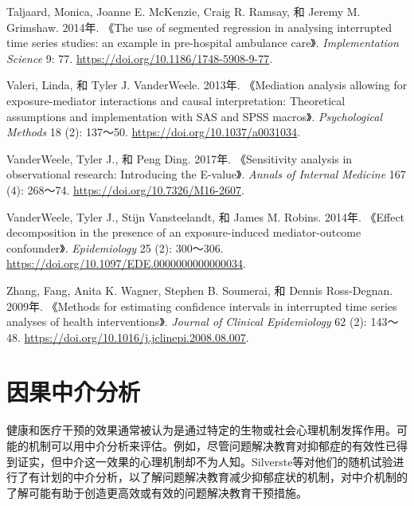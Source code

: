 \documentclass[
  chinese-hans,
  letterpaper,
  DIV=11,
  numbers=noendperiod]{scrreprt}
\newlength{\cslhangindent}
\newenvironment{CSLReferences}[2] %
 {\begin{list}{}{%
  \setlength{\itemindent}{0pt}
  \setlength{\leftmargin}{0pt}
  \setlength{\parsep}{0pt}
  \ifodd #1
   \setlength{\leftmargin}{\cslhangindent}
   \setlength{\itemindent}{-1\cslhangindent}
  \fi
  \setlength{\itemsep}{#2\baselineskip}}}
 {\end{list}}
\begin{document}
\begin{CSLReferences}{1}{1}
Taljaard, Monica, Joanne E. McKenzie, Craig R. Ramsay, 和 Jeremy M.
Grimshaw. 2014年. {《The use of segmented regression in analysing
interrupted time series studies: an example in pre-hospital ambulance
care》}. \emph{Implementation Science} 9: 77.
\url{https://doi.org/10.1186/1748-5908-9-77}.

Valeri, Linda, 和 Tyler J. VanderWeele. 2013年. {《Mediation analysis
allowing for exposure-mediator interactions and causal interpretation:
Theoretical assumptions and implementation with {SAS} and {SPSS}
macros》}. \emph{Psychological Methods} 18 (2): 137～50.
\url{https://doi.org/10.1037/a0031034}.

VanderWeele, Tyler J., 和 Peng Ding. 2017年. {《Sensitivity analysis in
observational research: Introducing the {E}-value》}. \emph{Annals of
Internal Medicine} 167 (4): 268～74.
\url{https://doi.org/10.7326/M16-2607}.

VanderWeele, Tyler J., Stijn Vansteelandt, 和 James M. Robins. 2014年.
{《Effect decomposition in the presence of an exposure-induced
mediator-outcome confounder》}. \emph{Epidemiology} 25 (2): 300～306.
\url{https://doi.org/10.1097/EDE.0000000000000034}.

Zhang, Fang, Anita K. Wagner, Stephen B. Soumerai, 和 Dennis
Ross-Degnan. 2009年. {《Methods for estimating confidence intervals in
interrupted time series analyses of health interventions》}.
\emph{Journal of Clinical Epidemiology} 62 (2): 143～48.
\url{https://doi.org/10.1016/j.jclinepi.2008.08.007}.

\end{CSLReferences}


\chapter{因果中介分析}\label{ux56e0ux679cux4e2dux4ecbux5206ux6790}

健康和医疗干预的效果通常被认为是通过特定的生物或社会心理机制发挥作用。可能的机制可以用中介分析来评估。例如，尽管问题解决教育对抑郁症的有效性已得到证实，但中介这一效果的心理机制却不为人知。Silverste等对他们的随机试验进行了有计划的中介分析，以了解问题解决教育减少抑郁症状的机制，对中介机制的了解可能有助于创造更高效或有效的问题解决教育干预措施。
\end{document}
